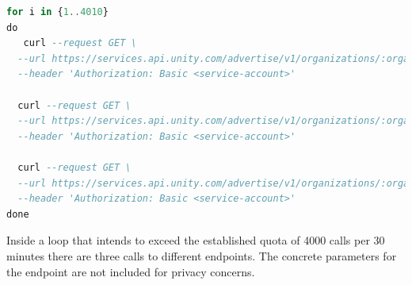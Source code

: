 \documentclass[english, 12pt, a4paper, sci, utf8, a-1b, online]{aaltothesis}
\begin{document}
\begin{lstlisting}[language=sql,firstnumber=1]
for i in {1..4010}
do
   curl --request GET \
  --url https://services.api.unity.com/advertise/v1/organizations/:organizationId/apps/ \
  --header 'Authorization: Basic <service-account>'
  
  curl --request GET \
  --url https://services.api.unity.com/advertise/v1/organizations/:organizationId/apps/:appId/campaigns \
  --header 'Authorization: Basic <service-account>'
  
  curl --request GET \
  --url https://services.api.unity.com/advertise/v1/organizations/:organizationId/apps/:appId/campaigns/:campaignId/budget \
  --header 'Authorization: Basic <service-account>'
done
\end{lstlisting}

Inside a loop that intends to exceed the established quota of 4000 calls per 30 minutes there are three calls to different endpoints. The concrete parameters for the endpoint are not included for privacy concerns.

\clearpage
\end{document}
